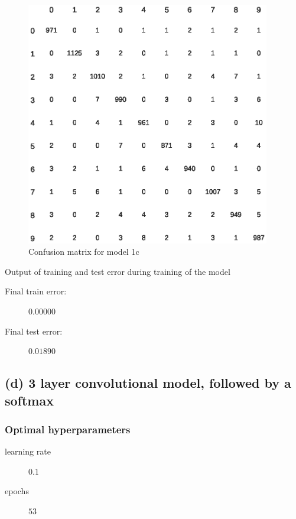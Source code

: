 \documentclass{article}
\begin{document}
\begin{figure}[H]
  \centering
  \includegraphics[width=0.95\textwidth]{confusion_matrix_1c.eps}
  \caption{Confusion matrix for model 1c}
  \label{fig:conf_1c}
\end{figure}

Output of training and test error during training of the model



\begin{description}
\item[Final train error:] $0.00000$
\item[Final test error:] $0.01890$
\end{description}

\newpage

\subsection{(d) 3 layer convolutional model, followed by a softmax}

\subsubsection{Optimal hyperparameters}

\begin{description}
\item[learning rate] $0.1$
\item[epochs] $53$
\end{description}
\end{document}
